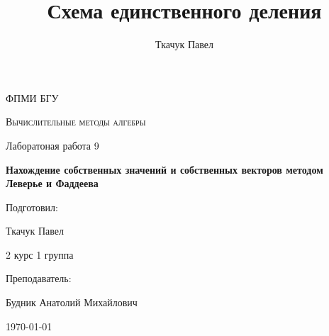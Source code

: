 \documentclass[11.4pt]{article}
\author{Ткачук Павел}
\title{Схема единственного деления}
\begin{document}
	\begin{titlepage}
		
		\centering
		{\scshape\LARGE ФПМИ БГУ \par}
		\vfill
		\begin{flushleft}
		{\scshape\Large Вычислительные методы алгебры\par Лаборатоная работа 9 \par}
		\vspace{1cm}
		{\huge\bfseries Нахождение собственных значений и собственных векторов методом Леверье и Фаддеева\par}
		\end{flushleft}
		\vspace{10cm}
		\begin{flushright}
		\large
		Подготовил:\par
		Ткачук Павел\par
		2 курс 1 группа\par
		\vspace{0.5cm}
		Преподаватель:\par
		Будник Анатолий Михайлович
		\end{flushright}
		
		\vfill
		{\large \today}
	\end{titlepage}
\end{document}
